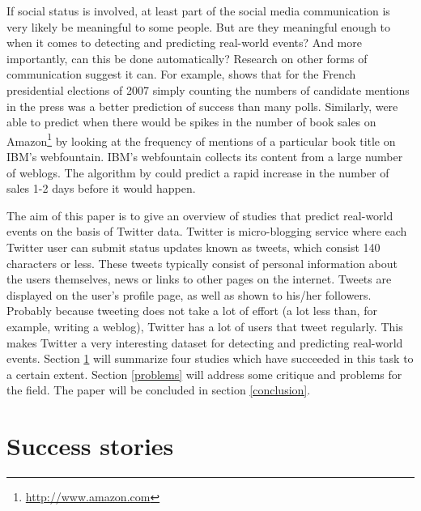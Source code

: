 \documentclass[12pt]{article}
\begin{document}

If social status is involved, at least part of the social media communication is very likely be meaningful to some people. But are they meaningful enough to when it comes to detecting and predicting real-world events? And more importantly, can this be done automatically? Research on other forms of communication suggest it can. For example,  shows that for the French presidential elections of 2007 simply counting the numbers of candidate mentions in the press was a better prediction of success than many polls. Similarly,  were able to predict when there would be spikes in the number of book sales on Amazon\footnote{\url{http://www.amazon.com}} by looking at the frequency of mentions of a particular book title on IBM's webfountain. IBM's webfountain collects its content from a large number of weblogs. The algorithm by  could predict a rapid increase in the number of sales 1-2 days before it would happen.

The aim of this paper is to give an overview of studies that predict real-world events on the basis of Twitter data. Twitter is micro-blogging service where each Twitter user can submit status updates known as tweets, which consist 140 characters or less. These tweets typically consist of personal information about the users themselves, news or links to other pages on the internet. Tweets are displayed on the user’s profile page, as well as shown to his/her followers. Probably because tweeting does not take a lot of effort (a lot less than, for example, writing a weblog), Twitter has a lot of users that tweet regularly. This makes Twitter a very interesting dataset for detecting and predicting real-world events. Section \ref{success} will summarize four studies which have succeeded in this task to a certain extent. Section \ref{problems} will address some critique and problems for the field. The paper will be concluded in section \ref{conclusion}.

\section{Success stories} \label{success}
\end{document}
